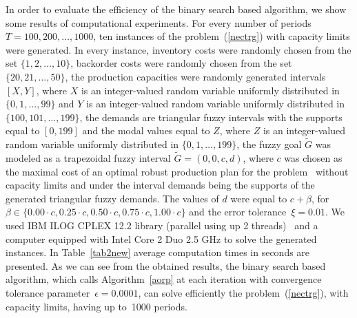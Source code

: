 \documentclass[11pt]{article}
\begin{document}
In order to evaluate the efficiency of the binary search based algorithm,  we show some results of computational
experiments.
For every number of periods $T=100, 200, \ldots, 1000$, ten instances of the problem~(\ref{nectrg}) with capacity limits
were generated. In every instance, inventory costs were randomly chosen from the set $\{1, 2, \ldots, 10\}$, backorder costs were randomly chosen from the set $\{20, 21, \ldots, 50\}$, the production capacities were randomly generated intervals $[X, Y]$, where $X$ is an 
integer-valued  random variable uniformly distributed in $\{0, 1, \ldots, 99\}$ and $Y$ is an integer-valued random variable uniformly distributed in $\{100, 101, \ldots, 199\}$,
the demands are  triangular fuzzy intervals with the supports equal to $[0, 199]$ and the modal values equal 
to $Z$, where $Z$ is an integer-valued random variable uniformly distributed in $\{0, 1, \ldots, 199\}$,
the fuzzy goal $\widetilde{G}$ was modeled as a trapezoidal  fuzzy interval 
$\widetilde{G}=(0,0, c,d)$, where $c$ 
was chosen as
the maximal cost of an optimal robust production 
plan for the problem~ without capacity limits 
and under the interval demands being the supports 
of the generated triangular fuzzy demands.
The values of $d$ were equal to $c+\beta$, for $\beta\in
\{0.00 \cdot c, 0.25 \cdot c, 0.50 \cdot c, 0.75 \cdot c, 1.00 \cdot c\}$
and the error tolerance~$\xi=0.01$.
We used  IBM ILOG CPLEX 12.2 library  (parallel using up 2 threads)~\cite{CPLEX}
 and a
 computer equipped with Intel Core 2 Duo 2.5 GHz to solve the generated instances.
In Table~\ref{tab2new} average  computation times in seconds are presented.
As we can see from the obtained results, 
the binary search based algorithm, which calls Algorithm~\ref{aorp}
at each iteration with 
convergence tolerance parameter~$\epsilon=0.0001$, 
can solve efficiently the problem~(\ref{nectrg}),  with capacity limits, having up to~1000 periods.
\end{document}
